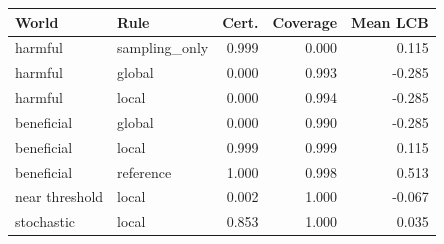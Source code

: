 \begin{tabular}{llrrr}
\toprule
World & Rule & Cert. & Coverage & Mean LCB\\
\midrule
harmful & sampling\_only & 0.999 & 0.000 & 0.115\\
harmful & global & 0.000 & 0.993 & -0.285\\
harmful & local & 0.000 & 0.994 & -0.285\\
beneficial & global & 0.000 & 0.990 & -0.285\\
beneficial & local & 0.999 & 0.999 & 0.115\\
beneficial & reference & 1.000 & 0.998 & 0.513\\
near threshold & local & 0.002 & 1.000 & -0.067\\
stochastic & local & 0.853 & 1.000 & 0.035\\
\bottomrule
\end{tabular}
